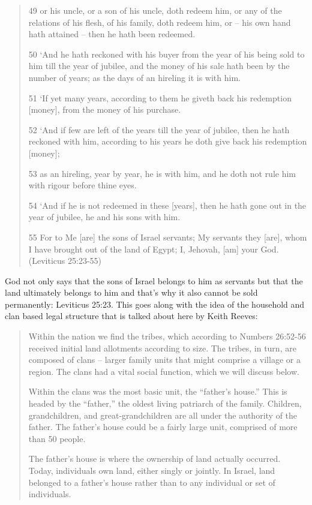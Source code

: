 \documentclass[11pt]{article}
\begin{document}
{\begin{quote}
49 or his uncle, or a son of his uncle, doth redeem him, or any of the relations of his flesh, of his family, doth redeem him, or -- his own hand hath attained -- then he hath been redeemed.

50 `And he hath reckoned with his buyer from the year of his being sold to him till the year of jubilee, and the money of his sale hath been by the number of years; as the days of an hireling it is with him.

51 `If yet many years, according to them he giveth back his redemption [money], from the money of his purchase.

52 `And if few are left of the years till the year of jubilee, then he hath reckoned with him, according to his years he doth give back his redemption [money];

53 as an hireling, year by year, he is with him, and he doth not rule him with rigour before thine eyes.

54 `And if he is not redeemed in these [years], then he hath gone out in the year of jubilee, he and his sons with him.

55 For to Me [are] the sons of Israel servants; My servants they [are], whom I have brought out of the land of Egypt; I, Jehovah, [am] your God. (Leviticus 25:23-55)
\end{quote} 

God not only says that the sons of Israel belongs to him as servants but that the land ultimately belongs to him and that's why it also cannot be sold permanently: Leviticus 25:23. This goes along with the idea of the household and clan based legal structure that is talked about here by Keith Reeves:

\begin{quote}
Within the nation we find the tribes, which according to Numbers 26:52-56 received initial land allotments according to size. The tribes, in turn, are composed of clans – larger family units that might comprise a village or a region. The clans had a vital social function, which we will discuss below.

Within the clans was the most basic unit, the “father’s house.” This is headed by the “father,” the oldest living patriarch of the family. Children, grandchildren, and great-grandchildren are all under the authority of the father. The father’s house could be a fairly large unit, comprised of more than 50 people.

The father’s house is where the ownership of land actually occurred. Today, individuals own land, either singly or jointly. In Israel, land belonged to a father’s house rather than to any individual or set of individuals.


\end{quote}}
\end{document}

